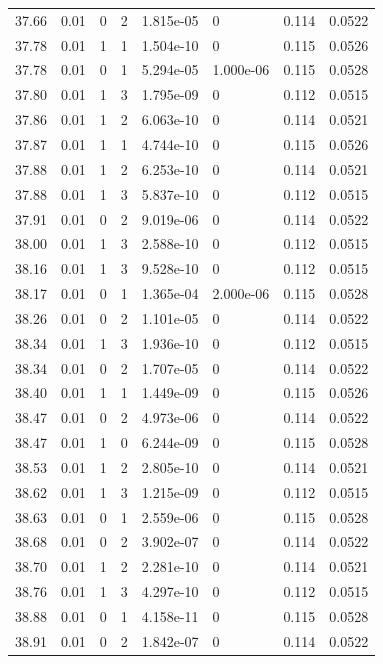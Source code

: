 \documentclass[preview]{standalone}
\begin{document}
{{{{{{{{{{{{{{{{\begin{tabular}{L{1.2cm}C{1.2cm} C{0.3cm}C{0.5cm} C{1.4cm}C{1.4cm} C{1.4cm}C{1.4cm}}
  37.66  &  0.01  & 0     &  2 &  1.815e-05  & 0  & 0.114 &  0.0522   \\ 
  37.78  &  0.01  & 1     &  1 &  1.504e-10  & 0  & 0.115 &  0.0526   \\ 
  37.78  &  0.01  & 0     &  1 &  5.294e-05  & 1.000e-06  & 0.115 &  0.0528   \\ 
  37.80  &  0.01  & 1     &  3 &  1.795e-09  & 0  & 0.112 &  0.0515   \\ 
  37.86  &  0.01  & 1     &  2 &  6.063e-10  & 0  & 0.114 &  0.0521   \\ 
  37.87  &  0.01  & 1     &  1 &  4.744e-10  & 0  & 0.115 &  0.0526   \\ 
  37.88  &  0.01  & 1     &  2 &  6.253e-10  & 0  & 0.114 &  0.0521   \\ 
  37.88  &  0.01  & 1     &  3 &  5.837e-10  & 0  & 0.112 &  0.0515   \\ 
  37.91  &  0.01  & 0     &  2 &  9.019e-06  & 0  & 0.114 &  0.0522   \\ 
  38.00  &  0.01  & 1     &  3 &  2.588e-10  & 0  & 0.112 &  0.0515   \\ 
  38.16  &  0.01  & 1     &  3 &  9.528e-10  & 0  & 0.112 &  0.0515   \\ 
  38.17  &  0.01  & 0     &  1 &  1.365e-04  & 2.000e-06  & 0.115 &  0.0528   \\ 
  38.26  &  0.01  & 0     &  2 &  1.101e-05  & 0  & 0.114 &  0.0522   \\ 
  38.34  &  0.01  & 1     &  3 &  1.936e-10  & 0  & 0.112 &  0.0515   \\ 
  38.34  &  0.01  & 0     &  2 &  1.707e-05  & 0  & 0.114 &  0.0522   \\ 
  38.40  &  0.01  & 1     &  1 &  1.449e-09  & 0  & 0.115 &  0.0526   \\ 
  38.47  &  0.01  & 0     &  2 &  4.973e-06  & 0  & 0.114 &  0.0522   \\ 
  38.47  &  0.01  & 1     &  0 &  6.244e-09  & 0  & 0.115 &  0.0528   \\ 
  38.53  &  0.01  & 1     &  2 &  2.805e-10  & 0  & 0.114 &  0.0521   \\ 
  38.62  &  0.01  & 1     &  3 &  1.215e-09  & 0  & 0.112 &  0.0515   \\ 
  38.63  &  0.01  & 0     &  1 &  2.559e-06  & 0  & 0.115 &  0.0528   \\ 
  38.68  &  0.01  & 0     &  2 &  3.902e-07  & 0  & 0.114 &  0.0522   \\ 
  38.70  &  0.01  & 1     &  2 &  2.281e-10  & 0  & 0.114 &  0.0521   \\ 
  38.76  &  0.01  & 1     &  3 &  4.297e-10  & 0  & 0.112 &  0.0515   \\ 
  38.88  &  0.01  & 0     &  1 &  4.158e-11  & 0  & 0.115 &  0.0528   \\ 
  38.91  &  0.01  & 0     &  2 &  1.842e-07  & 0  & 0.114 &  0.0522   \\ 
\hline 
\end{tabular} 

}}}}}}}}}}}}}}}}
\end{document}
